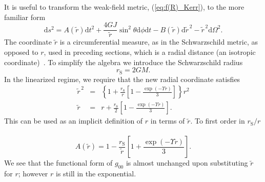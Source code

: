 \documentclass[aps,prd,amsfonts,amssymb,amsmath,nofootinbib,reprint,showpacs]{revtex4-1}
\newcommand{\eqnref}[1]{(\ref{eq:#1})}
\newcommand{\sub}[1]{\ensuremath{_\text{#1}}}
\newcommand{\dd}{\ensuremath{\text{d}}}
\begin{document}
It is useful to transform the weak-field metric, \eqnref{f(R)_Kerr}, to the more familiar form
\begin{equation}
\dd s^2 = A(\widetilde{r}) \dd t^2 + \frac{4GJ}{\widetilde{r}} \sin^2\theta \dd \phi \dd t - B(\widetilde{r})\dd \widetilde{r}^{\,2} - \widetilde{r}^{\,2} \dd \Omega^2.
\label{eq:Sph_sym}
\end{equation}
The coordinate $\widetilde{r}$ is a circumferential measure, as in the Schwarzschild metric, as opposed to $r$, used in preceding sections, which is a radial distance (an isotropic coordinate)~\cite{Misner1973, Olmo2007c}. To simplify the algebra we introduce the Schwarzschild radius
\begin{equation}
r\sub{S} = 2GM.
\end{equation}
In the linearized regime, we require that the new radial coordinate satisfies
\begin{eqnarray}
\widetilde{r}^{\,2} & = & \left\{1 + \frac{r\sub{S}}{r}\left[1 - \frac{\exp(-\Upsilon r)}{3}\right]\right\}r^2 \\
\widetilde{r} & = & r + \frac{r\sub{S}}{2}\left[1 - \frac{\exp(-\Upsilon r)}{3}\right].
\label{eq:r_tilde}
\end{eqnarray}
This can be used as an implicit definition of $r$ in terms of $\widetilde{r}$. To first order in ${r\sub{S}}/{r}$~\cite{Olmo2007c}
\begin{equation}
A(\widetilde{r}) = 1 - \frac{r\sub{S}}{\widetilde{r}}\left[1 + \frac{\exp(-\Upsilon r )}{3}\right].
\label{eq:A_metric}
\end{equation}
We see that the functional form of $g_{00}$ is almost unchanged upon substituting $\widetilde{r}$ for $r$; however $r$ is still in the exponential.
\end{document}
